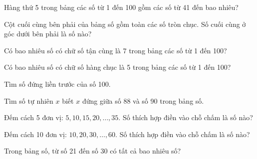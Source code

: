 \begin{ex}
Hàng thứ 5 trong bảng các số từ 1 đến 100 gồm các số từ 41 đến bao nhiêu?
\end{ex}

\begin{ex}
Cột cuối cùng bên phải của bảng số gồm toàn các số tròn chục. Số cuối cùng ở góc dưới bên phải là số nào?
\end{ex}

\begin{ex}
Có bao nhiêu số có chữ số tận cùng là 7 trong bảng các số từ 1 đến 100?
\end{ex}

\begin{ex}
Có bao nhiêu số có chữ số hàng chục là 5 trong bảng các số từ 1 đến 100?
\end{ex}

\begin{ex}
Tìm số đứng liền trước của số 100.
\end{ex}

\begin{ex}
Tìm số tự nhiên $x$ biết $x$ đứng giữa số 88 và số 90 trong bảng số.
\end{ex}

\begin{ex}
Đếm cách 5 đơn vị: $5, 10, 15, 20, \dots, 35$. Số thích hợp điền vào chỗ chấm là số nào?
\end{ex}

\begin{ex}
Đếm cách 10 đơn vị: $10, 20, 30, \dots, 60$. Số thích hợp điền vào chỗ chấm là số nào?
\end{ex}

\begin{ex}
Trong bảng số, từ số 21 đến số 30 có tất cả bao nhiêu số?
\end{ex}

